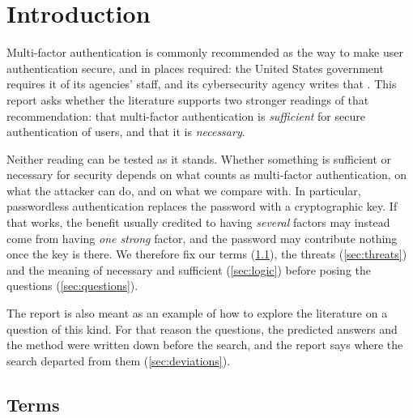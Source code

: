 
\section{Introduction}\label{sec:intro}

Multi-factor authentication is commonly recommended as the way to make
user authentication secure, and in places required: the United States
government requires it of its agencies' staff\autocite{OMB2022ZeroTrust},
and its cybersecurity agency writes that
.
This report asks whether the literature supports two stronger readings of
that recommendation: that multi-factor authentication is \emph{sufficient}
for secure authentication of users, and that it is \emph{necessary}.

Neither reading can be tested as it stands.
Whether something is sufficient or necessary for security depends on what
counts as multi-factor authentication, on what the attacker can do, and on
what we compare with.
In particular, passwordless authentication replaces the password with a
cryptographic key.
If that works, the benefit usually credited to having \emph{several}
factors may instead come from having \emph{one strong} factor, and the
password may contribute nothing once the key is there.
We therefore fix our terms (\cref{sec:terms}), the threats
(\cref{sec:threats}) and the meaning of necessary and sufficient
(\cref{sec:logic}) before posing the questions (\cref{sec:questions}).

The report is also meant as an example of how to explore the literature
on a question of this kind.
For that reason the questions, the predicted answers and the method were
written down before the search, and the report says where the search
departed from them (\cref{sec:deviations}).

\subsection{Terms}\label{sec:terms}

